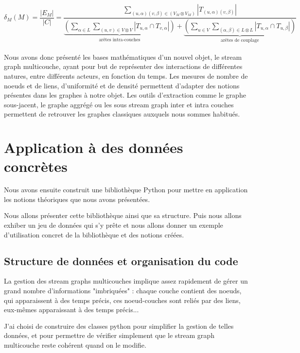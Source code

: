 \documentclass[11pt,a4paper]{article}
\theoremstyle{definition}
\theoremstyle{remark}
\theoremstyle{remark}
\def \stg {stream graph}
\def \stgm {stream graph multicouche}
\def \stgms {stream graphs multicouches}
\begin{document}
	\[
		\delta_M (M) = 
		\frac{|E_M|}{|C|}= 
		\frac{\sum_{(u,\alpha)(v,\beta) \in (V_M \otimes V_M)} |T_{(u,\alpha)(v,\beta)}|}
		{\underbrace{(\sum_{\alpha \in L}\sum_{(u,v) \in V\otimes V}|T_{u,\alpha} \cap T_{v,\alpha}|)}_{\text{arêtes intra-couches}}+\underbrace{( \sum_{u \in V } \sum_{(\alpha,\beta) \in L \otimes L}|T_{u,\alpha}\cap T_{u,\beta}|)}_{\text{arêtes de couplage}}}
	\]


\paragraph{}
Nous avons donc présenté les bases mathématiques d'un nouvel objet, le \stgm{}, ayant pour but de représenter des interactions de différentes natures, entre différents acteurs, en fonction du temps. Les mesures de nombre de noeuds et de liens, d'uniformité et de densité permettent d'adapter des notions présentes dans les graphes à notre objet. Les outils d'extraction comme le graphe sous-jacent, le graphe aggrégé ou les sous \stg{} inter et intra couches permettent de \og retrouver \fg{} les graphes classiques auxquels nous sommes habitués.
	
\section{Application à des données concrètes}


Nous avons ensuite construit une bibliothèque Python \cite{github} pour mettre en application les notions théoriques que nous avons présentées.

Nous allons présenter cette bibliothèque ainsi que sa structure. Puis nous allons exhiber un jeu de données qui s'y prête et nous allons donner un exemple d'utilisation concret de la bibliothèque et des notions créées.


\subsection{Structure de données et organisation du code} 
\label{descode}

	La gestion des \stgms{} implique assez rapidement de gérer un grand nombre d'informations "imbriquées" : chaque couche contient des noeuds, qui apparaissent à des temps précis, ces noeud-couches sont reliés par des liens, eux-mêmes apparaissant à des temps précis...
	
	J'ai choisi de construire des classes python pour simplifier la gestion de telles données, et pour permettre de vérifier simplement que le \stgm{} reste cohérent quand on le modifie.
	
\end{document}
